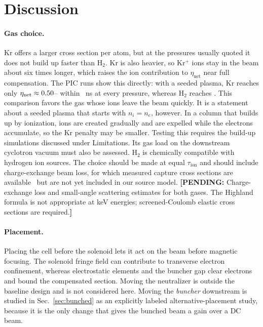 \documentclass[aps,prab,10pt,twocolumn,superscriptaddress,showpacs,floatfix]{revtex4-2}
\newcommand{\pending}[1]{\textcolor{red!70!black}{\textbf{[PENDING:} #1\textbf{]}}}
\newcommand{\Htwo}{\mathrm{H}_2}
\begin{document}
\section{Discussion}
\label{sec:discussion}

\paragraph{Gas choice.}
Kr offers a larger cross section per atom, but at the pressures usually quoted it does
not build up faster than $\Htwo$. Kr is also heavier, so Kr$^+$ ions stay in the beam
about six times longer, which raises the ion contribution to $\eta_{\mathrm{net}}$
near full compensation. The PIC runs show this directly: with a seeded plasma, Kr reaches
only $\eta_{\mathrm{net}}\approx0.50$--\numpicKretamax{} within \numpicns~ns at
every pressure, whereas $\Htwo$ reaches \numpicHtwoeta. This comparison favors the gas whose
ions leave the beam quickly. It is a statement about a seeded plasma that starts with
$n_i=n_e$, however. In a column that builds up by ionization, ions are created gradually
and are expelled while the electrons accumulate, so the Kr penalty may be smaller. Testing
this requires the build-up simulations discussed under Limitations. Its gas load on the downstream cyclotron vacuum must also be
assessed. $\Htwo$ is chemically compatible with hydrogen ion sources. The choice
should be made at equal $\tau_{\mathrm{ion}}$ and should include charge-exchange beam
loss, for which measured capture cross sections are available~\cite{Rudd1983} but are
not yet included in our source model.
\pending{Charge-exchange loss and small-angle scattering estimates for both gases.
The Highland formula is not appropriate at keV energies; screened-Coulomb elastic
cross sections are required.}

\paragraph{Placement.}
Placing the cell before the solenoid lets it act on the beam before magnetic focusing.
The solenoid fringe field can contribute to transverse electron confinement, whereas
electrostatic elements and the buncher gap clear electrons and bound the compensated
section. Moving the neutralizer is outside the baseline design and is not considered here.
Moving the \emph{buncher} downstream is studied in Sec.~\ref{sec:bunched} as an explicitly
labeled alternative-placement study, because it is the only change that gives the bunched beam
a gain over a DC beam.
\end{document}
